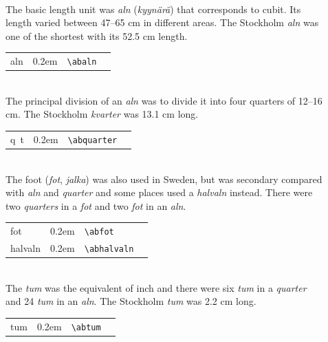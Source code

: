 \documentclass[a4paper]{article}
\newcommand{\samplefont}{\fontsize{16}{16}\abcursivefamily\spaceskip0.2em}
\newcommand{\sample}[1]{{\samplefont #1 \strut}}
\newcommand{\ltxncmd}[1]{\texttt{\textbackslash{}#1}}
\begin{document}
\begin{description}
\item [\sample{aln} \emph{aln}, \emph{kyynärä}] \mbox{} \\
  The basic length unit was \emph{aln} (\emph{kyynärä}) that
  corresponds to cubit. Its length varied between 47–65 cm in
  different areas. The Stockholm \emph{aln} was one of the shortest
  with its 52.5 cm length.
  \begin{center}
    \begin{tabular}{llll}
      {}aln & \sample{\abaln} & \ltxncmd{abaln} \\
    \end{tabular}
  \end{center}


\item [\sample{\abquarter} \emph{kvarter}, \emph{kortteli}] \mbox{}
  \\
  The principal division of an \emph{aln} was to divide it into four
  quarters of 12–16 cm. The Stockholm \emph{kvarter} was 13.1 cm long.
  \begin{center}
    \begin{tabular}{llll}
      {}q~t & \sample{\abquarter} & \ltxncmd{abquarter} \\
    \end{tabular}
  \end{center}

  
\item [\sample{fot} \emph{fot}, \emph{jalka}] \mbox {} \\
  The foot (\emph{fot}, \emph{jalka}) was also used in Sweden, but was
  secondary compared with \emph{aln} and \emph{quarter} and some
  places used a \emph{halvaln} instead. There were two \emph{quarters}
  in a \emph{fot} and two \emph{fot} in an \emph{aln}. 
  \begin{center}
    \begin{tabular}{llll}
      {}fot & \sample{\abfot} & \ltxncmd{abfot} \\
      {}halvaln & \sample{\abhalvaln} & \ltxncmd{abhalvaln} \\
    \end{tabular}
  \end{center}


\item [\sample{tum} \emph{tum}, \emph{tuuma}] \mbox{} \\
  The \emph{tum} was the equivalent of inch and there were six
  \emph{tum} in a \emph{quarter} and 24 \emph{tum} in an \emph{aln}.
  The Stockholm \emph{tum} was 2.2 cm long.
  \begin{center}
    \begin{tabular}{llll}
      {}tum & \sample{\abtum} & \ltxncmd{abtum} \\
    \end{tabular}
  \end{center}



\end{description}
\end{document}
